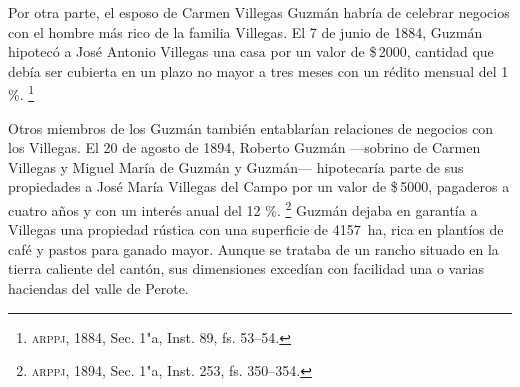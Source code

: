 \documentclass[14pt,twoside,final]{extbook} %
\let\oldfootnote\footnote
\renewcommand\footnote[1]{%
\oldfootnote{\hspace{1mm}#1}}
\begin{document}
Por otra parte, el esposo de Carmen Villegas Guzmán habría de celebrar negocios con el hombre más rico de la familia Villegas. El 7 de junio de 1884, Guzmán hipotecó a José Antonio Villegas una casa por un valor de \$\,2000, cantidad que debía ser cubierta en un plazo no mayor a tres meses con un rédito mensual del 1 \%.\footnote{\textsc{arppj}, 1884, Sec. 1"a, Inst. 89, fs. 53--54.}

Otros miembros de los Guzmán también entablarían relaciones de negocios con los Villegas. El 20 de agosto de 1894, Roberto Guzmán ---sobrino de Carmen Villegas y Miguel María de Guzmán y Guzmán--- hipotecaría parte de sus propiedades a José María Villegas del Campo por un valor de \$\,5000, pagaderos a cuatro años y con un interés anual del 12 \%.\footnote{\textsc{arppj}, 1894, Sec. 1"a, Inst. 253, fs. 350--354.} Guzmán dejaba en garantía a Villegas una propiedad rústica con una superficie de 4157~ha, rica en plantíos de café y pastos para ganado mayor. Aunque se trataba de un rancho situado en la tierra caliente del cantón, sus dimensiones excedían con facilidad una o varias haciendas del valle de Perote.
\end{document}

